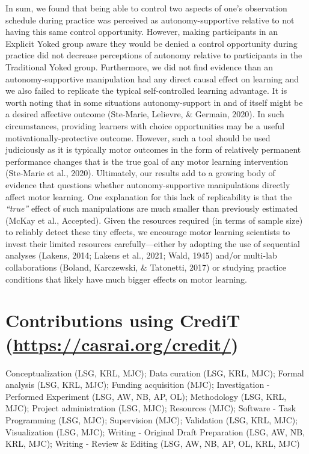\documentclass[
  english,
  man, donotrepeattitle,floatsintext]{apa7}
\begin{document}
In sum, we found that being able to control two aspects of one's observation schedule during practice was perceived as autonomy-supportive relative to not having this same control opportunity. However, making participants in an Explicit Yoked group aware they would be denied a control opportunity during practice did not decrease perceptions of autonomy relative to participants in the Traditional Yoked group. Furthermore, we did not find evidence than an autonomy-supportive manipulation had any direct causal effect on learning and we also failed to replicate the typical self-controlled learning advantage. It is worth noting that in some situations autonomy-support in and of itself might be a desired affective outcome (Ste-Marie, Lelievre, \& Germain, 2020). In such circumstances, providing learners with choice opportunities may be a useful motivationally-protective outcome. However, such a tool should be used judiciously as it is typically motor outcomes in the form of relatively permanent performance changes that is the true goal of any motor learning intervention (Ste-Marie et al., 2020). Ultimately, our results add to a growing body of evidence that questions whether autonomy-supportive manipulations directly affect motor learning. One explanation for this lack of replicability is that the \emph{``true''} effect of such manipulations are much smaller than previously estimated (McKay et al., Accepted). Given the resources required (in terms of sample size) to reliably detect these tiny effects, we encourage motor learning scientists to invest their limited resources carefully---either by adopting the use of sequential analyses (Lakens, 2014; Lakens et al., 2021; Wald, 1945) and/or multi-lab collaborations (Boland, Karczewski, \& Tatonetti, 2017) or studying practice conditions that likely have much bigger effects on motor learning.

\vfill

\hypertarget{contributions-using-credit-httpscasrai.orgcredit}{%
\section{\texorpdfstring{Contributions using CrediT (\url{https://casrai.org/credit/})}{Contributions using CrediT (https://casrai.org/credit/)}}\label{contributions-using-credit-httpscasrai.orgcredit}}

Conceptualization (LSG, KRL, MJC); Data curation (LSG, KRL, MJC); Formal analysis (LSG, KRL, MJC); Funding acquisition (MJC); Investigation - Performed Experiment (LSG, AW, NB, AP, OL); Methodology (LSG, KRL, MJC); Project administration (LSG, MJC); Resources (MJC); Software - Task Programming (LSG, MJC); Supervision (MJC); Validation (LSG, KRL, MJC); Visualization (LSG, MJC); Writing - Original Draft Preparation (LSG, AW, NB, KRL, MJC); Writing - Review \& Editing (LSG, AW, NB, AP, OL, KRL, MJC)
\end{document}
